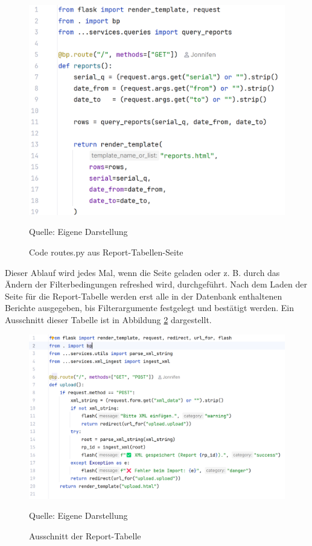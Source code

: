 \begin{figure}[H]
    \centering
    \includegraphics[width=1\textwidth]{Grafiken/route-reports}
    \caption{Code routes.py aus Report-Tabellen-Seite}
    \label{fig:Code routes.py aus Report-Tabellen-Seite}
    {Quelle: Eigene Darstellung}
\end{figure}

Dieser Ablauf wird jedes Mal, wenn die Seite geladen oder z. B. durch das Ändern der Filterbedingungen refreshed wird, durchgeführt.
Nach dem Laden der Seite für die Report-Tabelle werden erst alle in der Datenbank enthaltenen Berichte ausgegeben, bis Filterargumente festgelegt und bestätigt werden.
Ein Ausschnitt dieser Tabelle ist in Abbildung \ref{fig:Ausschnitt der Report-Tabelle} dargestellt.

\begin{figure}[H]
    \centering
    \includegraphics[width=1\textwidth]{Grafiken/Code route Up}
    \caption{Ausschnitt der Report-Tabelle}
    \label{fig:Ausschnitt der Report-Tabelle}
    {Quelle: Eigene Darstellung}
\end{figure}

